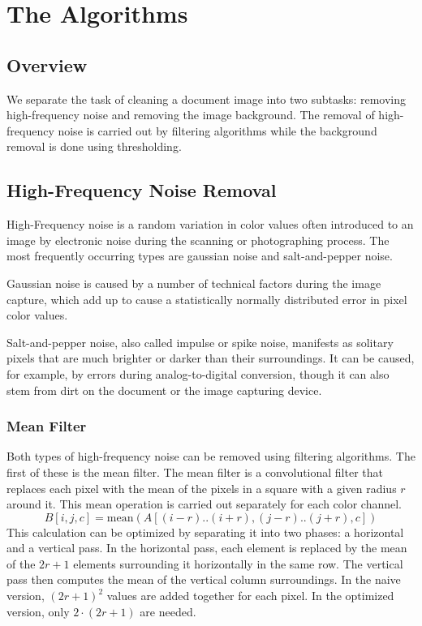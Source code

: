 \documentclass[sigconf]{acmart}
\begin{document}
\section{The Algorithms}
\subsection{Overview}
We separate the task of cleaning a document image into two subtasks: removing high-frequency noise and removing the image background. The removal of high-frequency noise is carried out by filtering algorithms while the background removal is done using thresholding.

\subsection{High-Frequency Noise Removal}
High-Frequency noise is a random variation in color values often introduced to an image by electronic noise during the scanning or photographing process. The most frequently occurring types are gaussian noise and salt-and-pepper noise.

Gaussian noise is caused by a number of technical factors during the image capture, which add up to cause a statistically normally distributed error in pixel color values.

Salt-and-pepper noise, also called impulse or spike noise, manifests as solitary pixels that are much brighter or darker than their surroundings. It can be caused, for example, by errors during analog-to-digital conversion, though it can also stem from dirt on the document or the image capturing device.

\subsubsection{Mean Filter}
Both types of high-frequency noise can be removed using filtering algorithms. The first of these is the mean filter. The mean filter is a convolutional filter that replaces each pixel with the mean of the pixels in a square with a given radius $r$ around it. This mean operation is carried out separately for each color channel.
$$
B[i,j,c] = \text{mean}(A[(i-r)..(i+r), (j-r)..(j+r), c])
$$
This calculation can be optimized by separating it into two phases: a horizontal and a vertical pass. In the horizontal pass, each element is replaced by the mean of the $2r+1$ elements surrounding it horizontally in the same row. The vertical pass then computes the mean of the vertical column surroundings. In the naive version, $(2r+1)^2$ values are added together for each pixel. In the optimized version, only $2 \cdot (2r+1)$ are needed.
\end{document}
